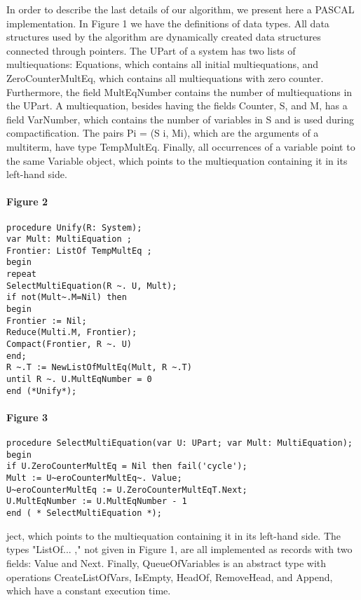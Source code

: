 \label{mmalg6}

In order to describe the last details of our algorithm, we present here a PASCAL
implementation. In Figure 1 we have the definitions of data types. All data
structures used by the algorithm are dynamically created data structures connected
through pointers. The UPart of a system has two lists of multiequations:
Equations, which contains all initial multiequations, and ZeroCounterMultEq,
which contains all multiequations with zero counter. Furthermore, the field
MultEqNumber contains the number of multiequations in the UPart. A multiequation,
besides having the fields Counter, S, and M, has a field VarNumber,
which contains the number of variables in S and is used during compactification.
The pairs Pi = (S i, Mi), which are the arguments of a multiterm, have type
TempMultEq. Finally, all occurrences of a variable point to the same Variable
object, which points to the multiequation containing it in its left-hand side. 

\paragraph{Figure 2}
\begin{verbatim}
procedure Unify(R: System);
var Mult: MultiEquation ;
Frontier: ListOf TempMultEq ;
begin
repeat
SelectMultiEquation(R ~. U, Mult);
if not(Mult~.M=Nil) then
begin
Frontier := Nil;
Reduce(Multi.M, Frontier);
Compact(Frontier, R ~. U)
end;
R ~.T := NewListOfMultEq(Mult, R ~.T)
until R ~. U.MultEqNumber = 0
end (*Unify*);
\end{verbatim}

\paragraph{Figure 3}
\begin{verbatim}
procedure SelectMultiEquation(var U: UPart; var Mult: MultiEquation);
begin
if U.ZeroCounterMultEq = Nil then fail('cycle');
Mult := U~eroCounterMultEq~. Value;
U~eroCounterMultEq := U.ZeroCounterMultEqT.Next;
U.MultEqNumber := U.MultEqNumber - 1
end ( * SelectMultiEquation *);
\end{verbatim}

ject, which points to the multiequation containing it in its left-hand side.
The types "ListOf... ," not given in Figure 1, are all implemented as records
with two fields: Value and Next. Finally, QueueOfVariables is an abstract type
with operations CreateListOfVars, IsEmpty, HeadOf, RemoveHead, and Append,
which have a constant execution time. 

